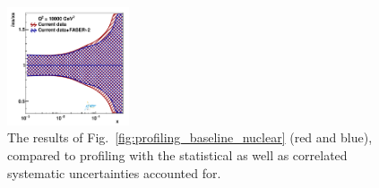 \begin{figure}[t]
\includegraphics[width=0.32\textwidth]{plots/nuclear_fasernu2/inclusive+charm_chargediscrimination/systVar05_FASERv2_q2_10000_pdf_s_ratio.pdf}
\caption{The results of Fig.~\ref{fig:profiling_baseline_nuclear} (red and blue), 
compared to profiling with the statistical as well as correlated systematic uncertainties accounted for.
}
\label{fig:profiling_syst_nuclear}
\end{figure}
